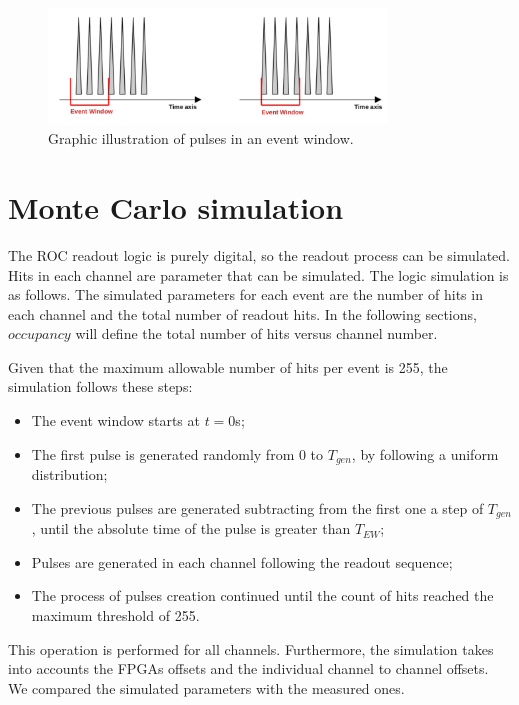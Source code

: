 \begin{figure}[!h]
\centering
\includegraphics[width =0.8\textwidth]{figures/pdf/eventwindow}
\caption{Graphic illustration of pulses in an event window.}
\label{fig:3}
\end{figure}
\section{Monte Carlo simulation}\label{MonteCarlo}
 
The ROC readout logic is purely digital, so the readout process can be simulated. Hits in each channel are parameter that can be simulated.
The logic simulation is as follows.
The simulated parameters for each event are the number of hits in each channel and the total number of readout hits.
In the following sections, $occupancy$ will define the total number of hits versus channel number.

Given that the maximum allowable number of hits per event is 255, the simulation follows these steps:
\begin{itemize}
\item The event window starts at $t=0$s;
  \item The first pulse is generated randomly from 0 to $T_{gen}$, by following a uniform distribution;
    \item The previous pulses are generated subtracting from the first one a step of $T_{gen}$, until the absolute time of the pulse is greater than $T_{EW}$;
\item Pulses are generated in each channel following the readout sequence;
  \item The process of pulses creation continued until the count of hits reached the maximum threshold of 255. 
\end{itemize}
This operation is performed for all channels.
Furthermore, the simulation takes into accounts the FPGAs offsets and the individual channel to channel offsets. 
We compared the simulated parameters with the measured ones. 


